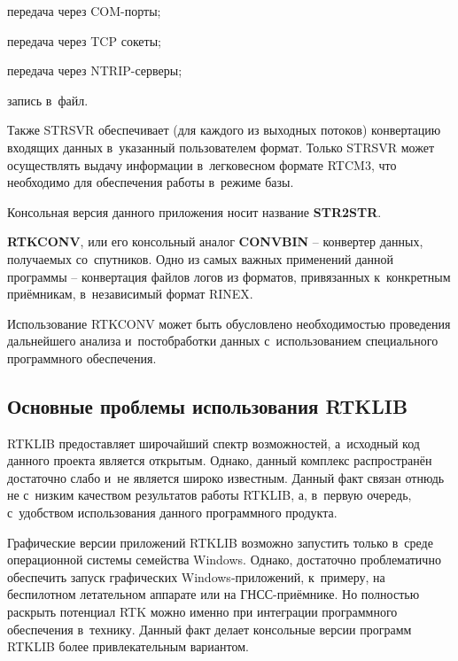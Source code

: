 \begin{dashitemize}
  \begin{dashitemize}
    \item передача через COM-порты;
    \item передача через TCP сокеты;
    \item передача через NTRIP-серверы;
    \item запись в~файл.
  \end{dashitemize}

  Также STRSVR обеспечивает (для каждого из выходных потоков) конвертацию входящих данных в~указанный пользователем формат. Только STRSVR может осуществлять выдачу информации в~легковесном формате RTCM3, что необходимо для обеспечения работы в~режиме базы. \par
  
  Консольная версия данного приложения носит название \textbf{STR2STR}.
  
  \item \textbf{RTKCONV}, или его консольный аналог \textbf{CONVBIN} -- конвертер данных, получаемых со~спутников. Одно из самых важных применений данной программы -- конвертация файлов логов из форматов, привязанных к~конкретным приёмникам, в~независимый формат RINEX. \par
  
  Использование RTKCONV может быть обусловлено необходимостью проведения дальнейшего анализа и~постобработки данных с~использованием специального программного обеспечения.
\end{dashitemize}

\subsection{Основные проблемы использования RTKLIB}

RTKLIB предоставляет широчайший спектр возможностей, а~исходный код данного проекта является открытым. Однако, данный комплекс распространён достаточно слабо и~не является широко известным. Данный факт связан отнюдь не с~низким качеством результатов работы RTKLIB, а, в~первую очередь, с~удобством использования данного программного продукта. \par

Графические версии приложений RTKLIB возможно запустить только в~среде операционной системы семейства Windows. Однако, достаточно проблематично обеспечить запуск графических Windows-приложений, к~примеру, на беспилотном летательном аппарате или на ГНСС-приёмнике. Но полностью раскрыть потенциал RTK можно именно при интеграции программного обеспечения в~технику. Данный факт делает консольные версии программ RTKLIB более привлекательным вариантом. \par

